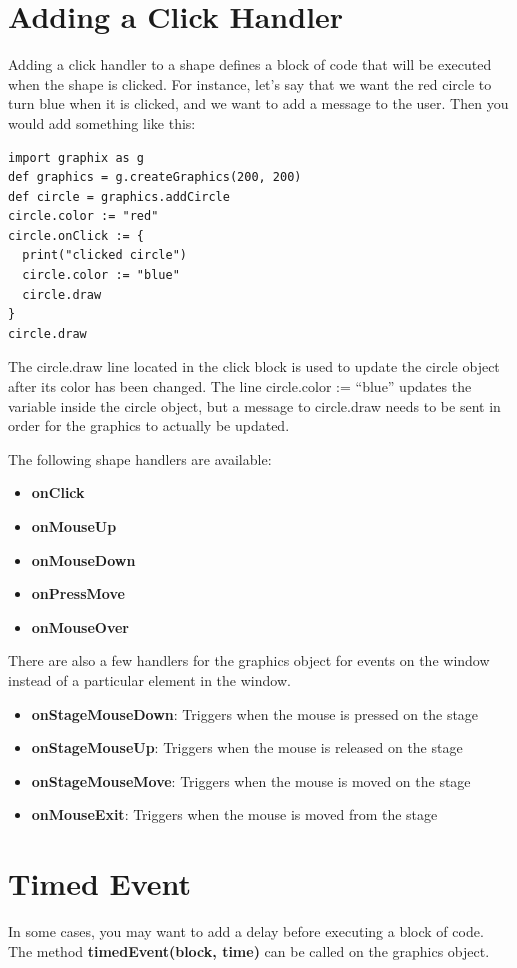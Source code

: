 \documentclass{article}
\begin{document}
\section{Adding a Click Handler}
Adding a click handler to a shape defines a block of code that will be executed when the shape is clicked. For instance,
let's say that we want the red circle to turn blue when it is clicked, and we want to add a message to the user. 
Then you would add something like this:
\begin{lstlisting}
import graphix as g
def graphics = g.createGraphics(200, 200)
def circle = graphics.addCircle
circle.color := "red"
circle.onClick := { 
  print("clicked circle") 
  circle.color := "blue"
  circle.draw
}
circle.draw
\end{lstlisting}
The \color{blue} circle.draw \color{black} line located in the click block is used to update the circle object after its color
has been changed. The line \color{blue}circle.color := ``blue'' \color{black} updates the variable inside the circle object, but
a message to circle.draw needs to be sent in order for the graphics to actually be updated.

The following shape handlers are available:
\begin{itemize}
\item \textbf{onClick} 
\item \textbf{onMouseUp}
\item \textbf{onMouseDown}
\item \textbf{onPressMove}
\item \textbf{onMouseOver}
\end{itemize}

There are also a few handlers for the graphics object for events on the window instead of a
particular element in the window.
\begin{itemize}
\item \textbf{onStageMouseDown}: Triggers when the mouse is pressed on the stage
\item \textbf{onStageMouseUp}: Triggers when the mouse is released on the stage
\item \textbf{onStageMouseMove}: Triggers when the mouse is moved on the stage
\item \textbf{onMouseExit}: Triggers when the mouse is moved from the stage
\end{itemize}

\section{Timed Event}
In some cases, you may want to add a delay before executing a block of code. The
method \textbf{timedEvent(block, time)} can be called on the graphics object.
\end{document}
